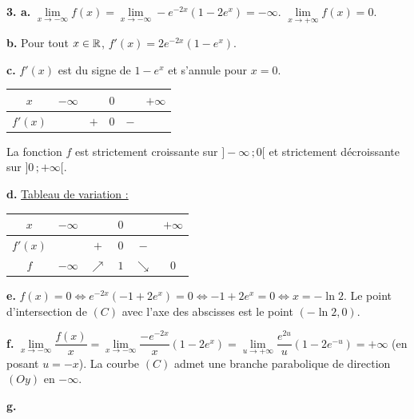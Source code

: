 \documentclass[11pt]{article}
\begin{document}
\textbf{3. a.} $\lim\limits_{x\to-\infty} f(x) = \lim\limits_{x\to-\infty} -e^{-2x}(1 - 2e^x) = -\infty$. $\lim\limits_{x\to+\infty} f(x) = 0$.

\textbf{b.} Pour tout $x \in \mathbb{R}$, $f'(x) = 2e^{-2x}(1 - e^x)$.

\textbf{c.} $f'(x)$ est du signe de $1 - e^x$ et s'annule pour $x = 0$.
\begin{center}\renewcommand{\arraystretch}{1.4}
\begin{tabular}{|c|ccccc|}
\hline
$x$ & $-\infty$ & & $0$ & & $+\infty$ \\
\hline
$f'(x)$ & & $+$ & $0$ & $-$ & \\
\hline
\end{tabular}
\end{center}
La fonction $f$ est strictement croissante sur $]-\infty\,;0[$ et strictement décroissante sur $]0\,;+\infty[$.

\textbf{d.} \underline{Tableau de variation :}
\begin{center}\renewcommand{\arraystretch}{1.4}
\begin{tabular}{|c|ccccc|}
\hline
$x$ & $-\infty$ & & $0$ & & $+\infty$ \\
\hline
$f'(x)$ & & $+$ & $0$ & $-$ & \\
\hline
$f$ & $-\infty$ & $\nearrow$ & $1$ & $\searrow$ & $0$ \\
\hline
\end{tabular}
\end{center}

\textbf{e.} $f(x) = 0 \Leftrightarrow e^{-2x}(-1 + 2e^x) = 0 \Leftrightarrow -1 + 2e^x = 0 \Leftrightarrow x = -\ln 2$. Le point d'intersection de $(C)$ avec l'axe des abscisses est le point $(-\ln 2, 0)$.

\textbf{f.} $\lim\limits_{x\to-\infty}\dfrac{f(x)}{x} = \lim\limits_{x\to-\infty}\dfrac{-e^{-2x}}{x}(1 - 2e^x) = \lim\limits_{u\to+\infty}\dfrac{e^{2u}}{u}(1 - 2e^{-u}) = +\infty$ (en posant $u = -x$). La courbe $(C)$ admet une branche parabolique de direction $(Oy)$ en $-\infty$.

\textbf{g.} \begin{center}
\end{center}
\end{document}
